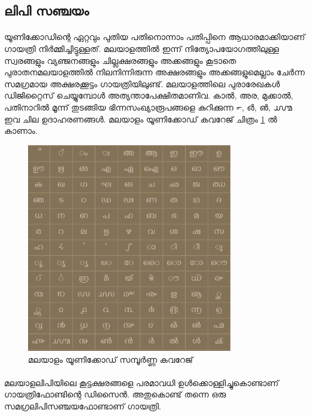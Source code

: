 \documentclass[12pt]{article}
\begin{document}
	\subsection{ലിപി സഞ്ചയം}
	
	\paragraph{}
	
	യൂണിക്കോഡിന്റെ ഏറ്റവും പുതിയ പതിനൊന്നാം പതിപ്പിനെ ആധാരമാക്കിയാണ് ഗായത്രി നിര്‍മ്മിച്ചിട്ടുള്ളത്. മലയാളത്തില്‍ ഇന്ന് നിത്യോപയോഗത്തിലുള്ള സ്വരങ്ങളും വ്യഞ്ജനങ്ങളും ചില്ലക്ഷരങ്ങളും അക്കങ്ങളും കൂടാതെ പുരാതനമലയാളത്തില്‍ നിലനിന്നിരുന്ന അക്ഷരങ്ങളും അക്കങ്ങളുമെല്ലാം ചേര്‍ന്ന സമഗ്രമായ അക്ഷരക്കൂട്ടം ഗായത്രിയിലുണ്ട്. മലയാളത്തിലെ പുരാരേഖകള്‍ ഡിജിറ്റൈസ് ചെയ്യുമ്പോള്‍ അത്യന്താപേക്ഷിതമാണിവ. കാല്‍, അര, മുക്കാല്‍, പതിനാറില്‍ മൂന്ന് തുടങ്ങിയ ഭിന്നസംഖ്യാരൂപങ്ങളെ കുറിക്കുന്ന ൳, ൴, ൵, ൸  ഇവ ചില ഉദാഹരണങ്ങള്‍. മലയാളം യൂണിക്കോഡ് കവറേജ് ചിത്രം \ref{unicode} ല്‍ കാണാം.
	
	\begin{figure}
		\begin{centering}
			\includegraphics[width=0.8\textwidth]{ml-unicode.png}
			\caption{മലയാളം യൂണിക്കോഡ് സമ്പൂര്‍ണ്ണ കവറേജ്}
			\label{unicode}
		\end{centering}
	\end{figure}
	
	\paragraph{}
	മലയാളലിപിയിലെ കൂട്ടക്ഷരങ്ങളെ പരമാവധി ഉള്‍ക്കൊള്ളിച്ചുകൊണ്ടാണ് ഗായത്രിഫോണ്ടിന്റെ ഡിസൈന്‍. അതുകൊണ്ട് തന്നെ ഒരു സമഗ്രലിപിസഞ്ചയഫോണ്ടാണ് ഗായത്രി.
	
\end{document}
